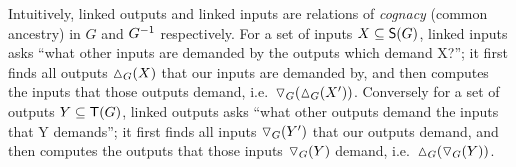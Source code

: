 Intuitively, linked outputs and linked inputs are relations of \emph{cognacy} (common ancestry) in $G$ and
$G^{-1}$ respectively. For a set of inputs $X \subseteq \mathsf{S}(G)$, linked inputs asks ``what other
inputs are demanded by the outputs which demand X?''; it first finds all outputs $\demandedByR_{G}(X)$ that
our inputs are demanded by, and then computes the inputs that those outputs demand,
i.e.~$\demandsR_{G}(\demandedByR_{G}(X'))$. Conversely for a set of outputs $Y \subseteq \mathsf{T}(G)$, linked outputs asks
``what other outputs demand the inputs that Y demands''; it first finds all inputs $\triangledown_{G}(Y')$ that
our outputs demand, and then computes the outputs that those inputs $\triangledown_{G}(Y)$ demand,
i.e.~$\demandedByR_{G}(\demandsR_{G}(Y))$.




